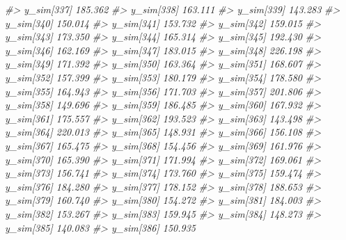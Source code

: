 \documentclass[
  10pt,
  italian,
  a4paper,
  extrafontsizes,onecolumn,openright
  ]{memoir}
\newenvironment{Shaded}{\begin{snugshade}}{\end{snugshade}}
\newcommand{\CommentTok}[1]{\textcolor[rgb]{0.56,0.35,0.01}{\textit{#1}}}
\begin{document}
\begin{Shaded}
\begin{Highlighting}[]
\CommentTok{\#\textgreater{}   y\_sim[337] 185.362}
\CommentTok{\#\textgreater{}   y\_sim[338] 163.111}
\CommentTok{\#\textgreater{}   y\_sim[339] 143.283}
\CommentTok{\#\textgreater{}   y\_sim[340] 150.014}
\CommentTok{\#\textgreater{}   y\_sim[341] 153.732}
\CommentTok{\#\textgreater{}   y\_sim[342] 159.015}
\CommentTok{\#\textgreater{}   y\_sim[343] 173.350}
\CommentTok{\#\textgreater{}   y\_sim[344] 165.314}
\CommentTok{\#\textgreater{}   y\_sim[345] 192.430}
\CommentTok{\#\textgreater{}   y\_sim[346] 162.169}
\CommentTok{\#\textgreater{}   y\_sim[347] 183.015}
\CommentTok{\#\textgreater{}   y\_sim[348] 226.198}
\CommentTok{\#\textgreater{}   y\_sim[349] 171.392}
\CommentTok{\#\textgreater{}   y\_sim[350] 163.364}
\CommentTok{\#\textgreater{}   y\_sim[351] 168.607}
\CommentTok{\#\textgreater{}   y\_sim[352] 157.399}
\CommentTok{\#\textgreater{}   y\_sim[353] 180.179}
\CommentTok{\#\textgreater{}   y\_sim[354] 178.580}
\CommentTok{\#\textgreater{}   y\_sim[355] 164.943}
\CommentTok{\#\textgreater{}   y\_sim[356] 171.703}
\CommentTok{\#\textgreater{}   y\_sim[357] 201.806}
\CommentTok{\#\textgreater{}   y\_sim[358] 149.696}
\CommentTok{\#\textgreater{}   y\_sim[359] 186.485}
\CommentTok{\#\textgreater{}   y\_sim[360] 167.932}
\CommentTok{\#\textgreater{}   y\_sim[361] 175.557}
\CommentTok{\#\textgreater{}   y\_sim[362] 193.523}
\CommentTok{\#\textgreater{}   y\_sim[363] 143.498}
\CommentTok{\#\textgreater{}   y\_sim[364] 220.013}
\CommentTok{\#\textgreater{}   y\_sim[365] 148.931}
\CommentTok{\#\textgreater{}   y\_sim[366] 156.108}
\CommentTok{\#\textgreater{}   y\_sim[367] 165.475}
\CommentTok{\#\textgreater{}   y\_sim[368] 154.456}
\CommentTok{\#\textgreater{}   y\_sim[369] 161.976}
\CommentTok{\#\textgreater{}   y\_sim[370] 165.390}
\CommentTok{\#\textgreater{}   y\_sim[371] 171.994}
\CommentTok{\#\textgreater{}   y\_sim[372] 169.061}
\CommentTok{\#\textgreater{}   y\_sim[373] 156.741}
\CommentTok{\#\textgreater{}   y\_sim[374] 173.760}
\CommentTok{\#\textgreater{}   y\_sim[375] 159.474}
\CommentTok{\#\textgreater{}   y\_sim[376] 184.280}
\CommentTok{\#\textgreater{}   y\_sim[377] 178.152}
\CommentTok{\#\textgreater{}   y\_sim[378] 188.653}
\CommentTok{\#\textgreater{}   y\_sim[379] 160.740}
\CommentTok{\#\textgreater{}   y\_sim[380] 154.272}
\CommentTok{\#\textgreater{}   y\_sim[381] 184.003}
\CommentTok{\#\textgreater{}   y\_sim[382] 153.267}
\CommentTok{\#\textgreater{}   y\_sim[383] 159.945}
\CommentTok{\#\textgreater{}   y\_sim[384] 148.273}
\CommentTok{\#\textgreater{}   y\_sim[385] 140.083}
\CommentTok{\#\textgreater{}   y\_sim[386] 150.935}

\end{Highlighting}
\end{Shaded}
\end{document}
